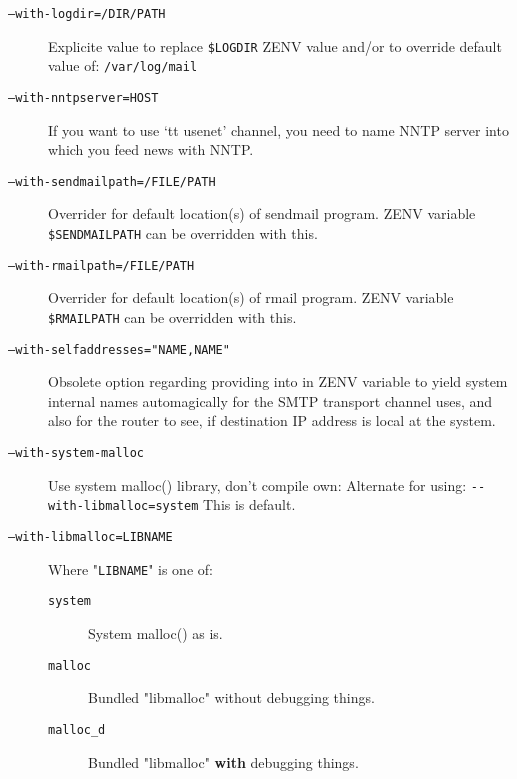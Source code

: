 \begin{multicols}{2}
\begin{description}
\item[\tt --with-logdir=/DIR/PATH] \mbox{}

Explicite value to replace {\tt \$LOGDIR} ZENV value and/or to
override default value of:  {\tt /var/log/mail}

\item[\tt --with-nntpserver=HOST] \mbox{}

If you want to use `{tt usenet}' channel, you need to name
NNTP server into which you feed news with NNTP.

\item[\tt --with-sendmailpath=/FILE/PATH] \mbox{}

Overrider for default location(s) of sendmail program.
ZENV variable \verb:$SENDMAILPATH: can be overridden with this.

\item[\tt --with-rmailpath=/FILE/PATH] \mbox{}

Overrider for default location(s) of rmail program.
ZENV variable \verb:$RMAILPATH: can be overridden with this.

\item[\tt --with-selfaddresses="NAME,NAME"] \mbox{}

Obsolete option regarding providing into in ZENV variable
to yield system internal names automagically for the SMTP
transport channel uses, and also for the router to see,
if destination IP address is local at the system.

\item[\tt --with-system-malloc] \mbox{}

Use system malloc() library, don't compile own:
Alternate for using: \verb:--with-libmalloc=system:
This is default.

\item[\tt --with-libmalloc=LIBNAME] \mbox{}

Where "{\tt LIBNAME}" is one of:
\begin{description}
\item[\tt system] \mbox{} 

System malloc() as is.

\item[\tt malloc] \mbox{}

Bundled "libmalloc" without debugging things.

\item[\tt malloc\_d] \mbox{}

Bundled "libmalloc" {\bf with} debugging things.
\end{description}


\end{description}
\end{multicols}
